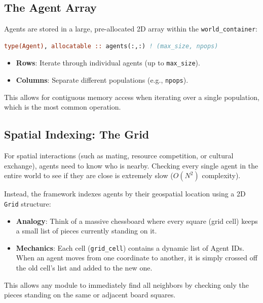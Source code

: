 \subsection{The Agent Array}
Agents are stored in a large, pre-allocated 2D array within the \texttt{world\_container}:
\begin{lstlisting}[language=Fortran]
type(Agent), allocatable :: agents(:,:) ! (max_size, npops)
\end{lstlisting}
\begin{itemize}
    \item \textbf{Rows}: Iterate through individual agents (up to \texttt{max\_size}).
    \item \textbf{Columns}: Separate different populations (e.g., \texttt{npops}).
\end{itemize}
This allows for contiguous memory access when iterating over a single population, which is the most common operation.

\subsection{Spatial Indexing: The Grid}
For spatial interactions (such as mating, resource competition, or cultural exchange), agents need to know who is nearby. Checking every single agent in the entire world to see if they are close is extremely slow ($O(N^2)$ complexity). 

Instead, the framework indexes agents by their geospatial location using a 2D \texttt{Grid} structure:
\begin{itemize}
    \item \textbf{Analogy}: Think of a massive chessboard where every square (grid cell) keeps a small list of pieces currently standing on it.
    \item \textbf{Mechanics}: Each cell (\texttt{grid\_cell}) contains a dynamic list of Agent IDs. When an agent moves from one coordinate to another, it is simply crossed off the old cell's list and added to the new one.
\end{itemize}
This allows any module to immediately find all neighbors by checking only the pieces standing on the same or adjacent board squares.


